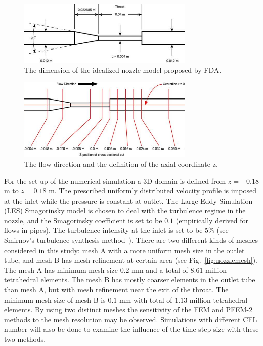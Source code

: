 \begin{figure}[htbp]
    \centering
    \includegraphics[width=3.3in]{imgs/nozzle_pump/nozzle_geo_2.png}
    \caption{The dimension of the idealized nozzle model proposed by FDA.}
    \label{fig:nozzlegeo1}
\end{figure}
\begin{figure}[htbp]
    \centering
    \includegraphics[width=3.3in]{imgs/nozzle_pump/nozzle_CS_2.png}
    \caption{The flow direction and the definition of the axial coordinate z.}
    \label{fig:nozzlegeo2}
\end{figure}


For the set up of the numerical simulation a 3D domain is defined from $z=-0.18$ m to $z=0.18$ m. The prescribed uniformly distributed velocity profile is imposed at the inlet while the pressure is constant at outlet. The Large Eddy Simulation (LES) Smagorinsky model is chosen to deal with the turbulence regime in the nozzle, and the Smagorinsky coefficient is set to be $0.1$ (empirically derived for flows in pipes). The turbulence intensity at the inlet is set to be $5$\% (see Smirnov's turbulence synthesis method~\cite{Smirnov2001}). There are two different kinds of meshes considered in this study: mesh A with a more uniform mesh size in the outlet tube, and mesh B has mesh refinement at certain area (see Fig.~\ref{fig:nozzlemesh}). The mesh A has minimum mesh size $0.2$ mm and a total of $8.61$ million tetrahedral elements. The mesh B has mostly coarser elements in the outlet tube than mesh A, but with mesh refinement near the exit of the throat. The minimum mesh size of mesh B is $0.1$ mm with total of $1.13$ million tetrahedral elements. By using two distinct meshes the sensitivity of the FEM and PFEM-2 methods to the mesh resolution may be observed. Simulations with different CFL number will also be done to examine the influence of the time step size with these two methods.

